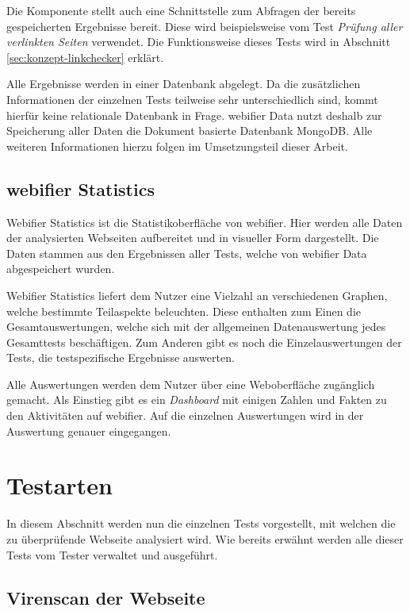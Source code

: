 Die Komponente stellt auch eine Schnittstelle zum Abfragen der bereits gespeicherten Ergebnisse bereit. Diese wird beispielsweise vom Test \textit{Prüfung aller verlinkten Seiten} verwendet. Die Funktionsweise dieses Tests wird in Abschnitt \ref{sec:konzept-linkchecker} erklärt.

Alle Ergebnisse werden in einer Datenbank abgelegt. Da die zusätzlichen Informationen der einzelnen Tests teilweise sehr unterschiedlich sind, kommt hierfür keine relationale Datenbank in Frage. webifier Data nutzt deshalb zur Speicherung aller Daten die Dokument basierte Datenbank MongoDB. Alle weiteren Informationen hierzu folgen im Umsetzungsteil dieser Arbeit.

\subsection{webifier Statistics}
Webifier Statistics ist die Statistikoberfläche von webifier. Hier werden alle Daten der analysierten Webseiten aufbereitet und in visueller Form dargestellt. Die Daten stammen aus den Ergebnissen aller Tests, welche von webifier Data abgespeichert wurden.

Webifier Statistics liefert dem Nutzer eine Vielzahl an verschiedenen Graphen, welche bestimmte Teilaspekte beleuchten. Diese enthalten zum Einen die Gesamtauswertungen, welche sich mit der allgemeinen Datenauswertung jedes Gesamttests beschäftigen. Zum Anderen gibt es noch die Einzelauswertungen der Tests, die testspezifische Ergebnisse auswerten.

Alle Auswertungen werden dem Nutzer über eine Weboberfläche zugänglich gemacht. Als Einstieg gibt es ein \textit{Dashboard} mit einigen Zahlen und Fakten zu den Aktivitäten auf webifier. Auf die einzelnen Auswertungen wird in der Auswertung genauer eingegangen.

\section{Testarten}
\label{sec:konzept-testarten}

In diesem Abschnitt werden nun die einzelnen Tests vorgestellt, mit welchen die zu überprüfende Webseite analysiert wird. Wie bereits erwähnt werden alle dieser Tests vom Tester verwaltet und ausgeführt.

\subsection{Virenscan der Webseite}

